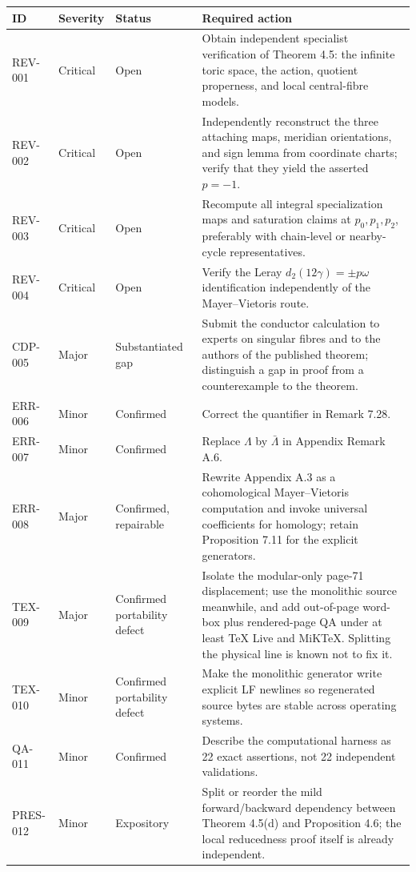 \documentclass[11pt]{article}
\begin{document}
\begin{longtable}{@{}p{}p{}p{}p{}@{}}
\toprule
ID & Severity & Status & Required action \\
\midrule
\endhead
REV-001 & Critical & Open & Obtain independent specialist verification of Theorem 4.5: the infinite toric space, the action, quotient properness, and local central-fibre models. \\
REV-002 & Critical & Open & Independently reconstruct the three attaching maps, meridian orientations, and sign lemma from coordinate charts; verify that they yield the asserted $p=-1$. \\
REV-003 & Critical & Open & Recompute all integral specialization maps and saturation claims at $p_0,p_1,p_2$, preferably with chain-level or nearby-cycle representatives. \\
REV-004 & Critical & Open & Verify the Leray $d_2(12\gamma)=\pm p\omega$ identification independently of the Mayer--Vietoris route. \\
CDP-005 & Major & Substantiated gap & Submit the conductor calculation to experts on singular fibres and to the authors of the published theorem; distinguish a gap in proof from a counterexample to the theorem. \\
ERR-006 & Minor & Confirmed & Correct the quantifier in Remark 7.28. \\
ERR-007 & Minor & Confirmed & Replace $\Lambda$ by $\bar\Lambda$ in Appendix Remark A.6. \\
ERR-008 & Major & Confirmed, repairable & Rewrite Appendix A.3 as a cohomological Mayer--Vietoris computation and invoke universal coefficients for homology; retain Proposition 7.11 for the explicit generators. \\
TEX-009 & Major & Confirmed portability defect & Isolate the modular-only page-71 displacement; use the monolithic source meanwhile, and add out-of-page word-box plus rendered-page QA under at least \TeX{} Live and MiK\TeX{}. Splitting the physical line is known not to fix it. \\
TEX-010 & Minor & Confirmed portability defect & Make the monolithic generator write explicit LF newlines so regenerated source bytes are stable across operating systems. \\
QA-011 & Minor & Confirmed & Describe the computational harness as 22 exact assertions, not 22 independent validations. \\
PRES-012 & Minor & Expository & Split or reorder the mild forward/backward dependency between Theorem 4.5(d) and Proposition 4.6; the local reducedness proof itself is already independent. \\
\bottomrule
\end{longtable}
\end{document}
